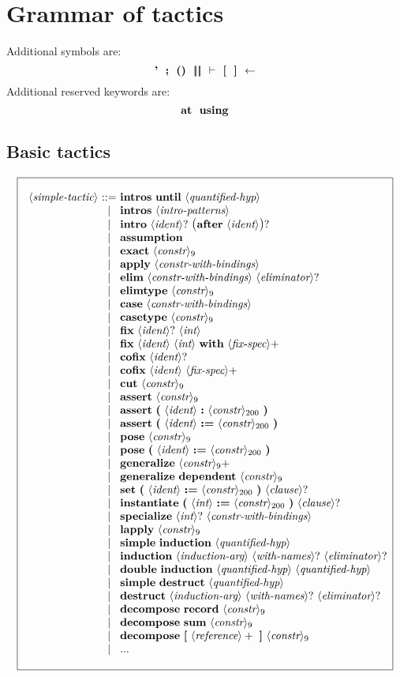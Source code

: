 \documentclass{article}
\makeatletter
\def\bfbar{\ensuremath{|\hskip -0.22em{}|\hskip -0.24em{}|}}
\def\TERMbarbar{\bfbar\bfbar}
\def\GR#1{\text{\large(}#1\text{\large)}}
\def\NT#1{\langle\textit{#1}\rangle}
\def\NTL#1#2{\langle\textit{#1}\rangle_{#2}}
\def\TERM#1{{\bf\textrm{\bf #1}}}
\def\KWD#1{\TERM{#1}}
\def\PLUS#1{#1+}
\def\OPT#1{#1?}
\def\OPTGR#1{\GR{#1}?}
\newenvironment{cadre}
        {\begin{array}{|c|}\hline\\}
        {\\\\\hline\end{array}}
\newenvironment{rulebox}
        {$$\begin{cadre}\begin{array}{r@{~}c@{~}l@{}l@{}r}}
        {\end{array}\end{cadre}$$}
\def\DEFNT#1{\NT{#1} & ::= &}
\def\nlsep{\\&|&}
\newenvironment{rules}
        {\begin{center}\begin{rulebox}}
        {\end{rulebox}\end{center}}
\makeatother
\begin{document}

\section{Grammar of tactics}

\def\tacconstr{\NTL{constr}{9}}
\def\taclconstr{\NTL{constr}{200}}

Additional symbols are:
$$ \TERM{'}
~~ \KWD{;}
~~ \TERM{()}
~~ \TERMbarbar
~~ \TERM{$\vdash$}
~~ \TERM{[}
~~ \TERM{]}
~~ \TERM{$\leftarrow$}
$$
Additional reserved keywords are:
$$ \KWD{at}
~~ \TERM{using}
$$

\subsection{Basic tactics}

\begin{rules}
\DEFNT{simple-tactic}
       \TERM{intros}~\TERM{until}~\NT{quantified-hyp}
\nlsep \TERM{intros}~\NT{intro-patterns}
\nlsep \TERM{intro}~\OPT{\NT{ident}}~\OPTGR{\TERM{after}~\NT{ident}}
\nlsep \TERM{assumption}
\nlsep \TERM{exact}~\tacconstr
\nlsep \TERM{apply}~\NT{constr-with-bindings}
\nlsep \TERM{elim}~\NT{constr-with-bindings}~\OPT{\NT{eliminator}}
\nlsep \TERM{elimtype}~\tacconstr
\nlsep \TERM{case}~\NT{constr-with-bindings}
\nlsep \TERM{casetype}~\tacconstr
\nlsep \KWD{fix}~\OPT{\NT{ident}}~\NT{int}
\nlsep \KWD{fix}~\NT{ident}~\NT{int}~\KWD{with}~\PLUS{\NT{fix-spec}}
\nlsep \KWD{cofix}~\OPT{\NT{ident}}
\nlsep \KWD{cofix}~\NT{ident}~\PLUS{\NT{fix-spec}}
\nlsep \TERM{cut}~\tacconstr
\nlsep \TERM{assert}~\tacconstr
\nlsep \TERM{assert}~
  \TERM{(}~\NT{ident}~\KWD{:}~\taclconstr~\TERM{)}
\nlsep \TERM{assert}~
  \TERM{(}~\NT{ident}~\KWD{:=}~\taclconstr~\TERM{)}
\nlsep \TERM{pose}~\tacconstr
\nlsep \TERM{pose}~
  \TERM{(}~\NT{ident}~\KWD{:=}~\taclconstr~\TERM{)}
\nlsep \TERM{generalize}~\PLUS{\tacconstr}
\nlsep \TERM{generalize}~\TERM{dependent}~\tacconstr
\nlsep \TERM{set}~
  \TERM{(}~\NT{ident}~\KWD{:=}~\taclconstr~\TERM{)}~\OPT{\NT{clause}}
\nlsep \TERM{instantiate}~
  \TERM{(}~\NT{int}~\TERM{:=}~\taclconstr~\TERM{)}~\OPT{\NT{clause}}
\nlsep \TERM{specialize}~\OPT{\NT{int}}~\NT{constr-with-bindings}
\nlsep \TERM{lapply}~\tacconstr
\nlsep \TERM{simple}~\TERM{induction}~\NT{quantified-hyp}
\nlsep \TERM{induction}~\NT{induction-arg}~\OPT{\NT{with-names}}
       ~\OPT{\NT{eliminator}}
\nlsep \TERM{double}~\TERM{induction}~\NT{quantified-hyp}~\NT{quantified-hyp}
\nlsep \TERM{simple}~\TERM{destruct}~\NT{quantified-hyp}
\nlsep \TERM{destruct}~\NT{induction-arg}~\OPT{\NT{with-names}}
       ~\OPT{\NT{eliminator}}
\nlsep \TERM{decompose}~\TERM{record}~\tacconstr
\nlsep \TERM{decompose}~\TERM{sum}~\tacconstr
\nlsep \TERM{decompose}~\TERM{[}~\PLUS{\NT{reference}}~\TERM{]}
       ~\tacconstr
\nlsep ...
\end{rules}
\end{document}
